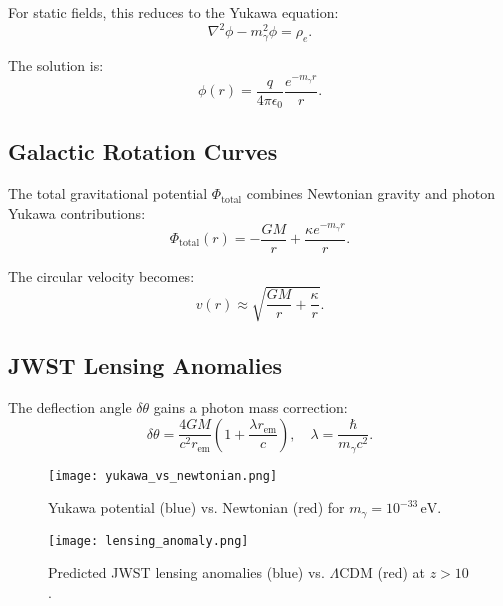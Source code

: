 \documentclass[12pt, a4paper]{article}
\begin{document}
For static fields, this reduces to the Yukawa equation:
\begin{equation}
\nabla^2 \phi - m_\gamma^2 \phi = \rho_e.
\label{eq:yukawa}
\end{equation}

The solution is:
\begin{equation}
\phi(r) = \frac{q}{4\pi \epsilon_0} \frac{e^{-m_\gamma r}}{r}.
\label{eq:yukawa_sol}
\end{equation}

\subsection{Galactic Rotation Curves}
\label{subsec:rotation}

The total gravitational potential \( \Phi_{\text{total}} \) combines Newtonian gravity and photon Yukawa contributions:
\begin{equation}
\Phi_{\text{total}}(r) = -\frac{GM}{r} + \frac{\kappa e^{-m_\gamma r}}{r}.
\label{eq:total_potential}
\end{equation}

The circular velocity becomes:
\begin{equation}
v(r) \approx \sqrt{\frac{GM}{r} + \frac{\kappa}{r}}.
\label{eq:velocity}
\end{equation}

\subsection{JWST Lensing Anomalies}
\label{subsec:lensing}

The deflection angle \( \delta \theta \) gains a photon mass correction:
\begin{equation}
\delta \theta = \frac{4GM}{c^2 r_{\text{em}}} \left(1 + \frac{\lambda r_{\text{em}}}{c}\right), \quad \lambda = \frac{\hbar}{m_\gamma c^2}.
\label{eq:lensing}
\end{equation}

\begin{figure}[t]
\centering
\texttt{[image: yukawa\_vs\_newtonian.png]}
\caption{Yukawa potential (blue) vs. Newtonian (red) for \( m_\gamma = 10^{-33} \, \text{eV} \).}
\label{fig:yukawa}
\end{figure}

\begin{figure}[t]
\centering
\texttt{[image: lensing\_anomaly.png]}
\caption{Predicted JWST lensing anomalies (blue) vs. \(\Lambda\)CDM (red) at \( z > 10 \).}
\label{fig:lensing_anomaly}
\end{figure}
\end{document}

